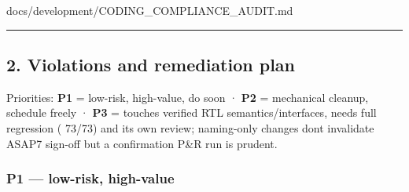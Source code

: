 \begin{relocated}{docs/development/CODING_COMPLIANCE_AUDIT.md}
{}

\begin{center}\rule{0.5\linewidth}{0.5pt}\end{center}

\subsection{2. Violations and remediation plan}\label{um:guide:coding-compliance-audit:2-violations-and-remediation-plan}

Priorities: \textbf{P1} = low-risk, high-value, do soon · \textbf{P2} =
mechanical cleanup, schedule freely · \textbf{P3} = touches verified RTL
semantics/\allowbreak{}interfaces, needs full regression (
73/73) and its own review; naming-only changes don\textquotesingle t
invalidate ASAP7 sign-off but a confirmation P\&R run is prudent.

\subsubsection{P1 --- low-risk, high-value}\label{um:guide:coding-compliance-audit:p1-low-risk-high-value}

{\footnotesize\setlength{\tabcolsep}{3pt}

}
\end{relocated}
